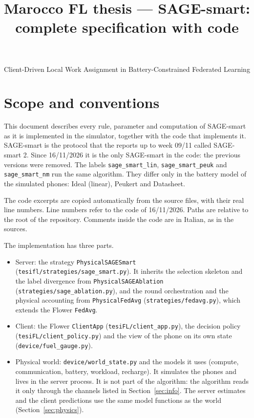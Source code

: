\documentclass[11pt,a4paper]{article}
\title{\bfseries Marocco FL thesis --- SAGE-smart: complete specification with code}
\author{}
\date{}
\newcommand{\cf}[1]{\texttt{#1}}
\begin{document}
\maketitle
\vspace{-3.2em}
\begin{center}
Client-Driven Local Work Assignment in Battery-Constrained Federated Learning
\end{center}
\vspace{1em}

\tableofcontents
\newpage

\section{Scope and conventions}
\label{sec:scope}

This document describes every rule, parameter and computation of SAGE-smart as
it is implemented in the simulator, together with the code that implements it.
SAGE-smart is the protocol that the reports up to week 09/11 called
SAGE-smart 2. Since 16/11/2026 it is the only SAGE-smart in the code: the
previous versions were removed. The labels \cf{sage\_smart\_lin},
\cf{sage\_smart\_peuk} and \cf{sage\_smart\_nm} run the same algorithm. They
differ only in the battery model of the simulated phones: Ideal (linear),
Peukert and Datasheet.

The code excerpts are copied automatically from the source files, with their
real line numbers. Line numbers refer to the code of 16/11/2026. Paths are
relative to the root of the repository. Comments inside the code are in
Italian, as in the sources.

The implementation has three parts.
\begin{itemize}
  \item Server: the strategy \cf{PhysicalSAGESmart}
        (\cf{tesifl/strategies/sage\_smart.py}). It inherits the selection
        skeleton and the label divergence from \cf{PhysicalSAGEAblation}
        (\cf{strategies/sage\_ablation.py}), and the round orchestration and
        the physical accounting from \cf{PhysicalFedAvg}
        (\cf{strategies/fedavg.py}), which extends the Flower \cf{FedAvg}.
  \item Client: the Flower \cf{ClientApp} (\cf{tesiFL/client\_app.py}), the
        decision policy (\cf{tesiFL/client\_policy.py}) and the view of the
        phone on its own state (\cf{device/fuel\_gauge.py}).
  \item Physical world: \cf{device/world\_state.py} and the models it uses
        (compute, communication, battery, workload, recharge). It simulates
        the phones and lives in the server process. It is not part of the
        algorithm: the algorithm reads it only through the channels listed in
        Section~\ref{sec:info}. The server estimates and the client
        predictions use the same model functions as the world
        (Section~\ref{sec:physics}).
\end{itemize}
\end{document}
